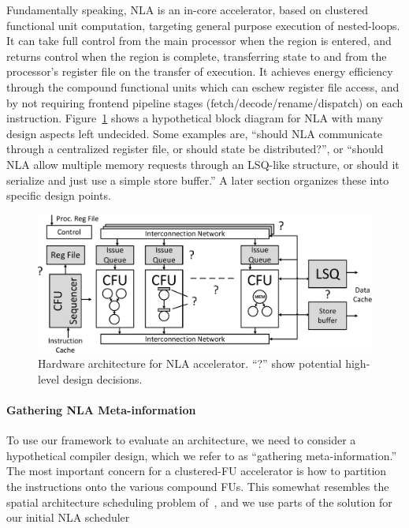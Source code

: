 Fundamentally speaking, NLA is an in-core accelerator, based on clustered functional
unit computation, targeting general purpose execution of nested-loops.  It can
take full control from the main processor when the region is entered, and returns
control when the region is complete, transferring state to and from the processor's
register file on the transfer of execution.   It achieves energy efficiency through
the compound functional units which can eschew register file access, and by not
requiring frontend pipeline stages (fetch/decode/rename/dispatch) on each instruction.
Figure~\ref{fig:nla-arch} shows a hypothetical block diagram for NLA with many design
aspects left undecided.  Some examples are, ``should NLA communicate through
a centralized register file, or should state be distributed?'',  or ``should NLA allow
multiple memory requests through an LSQ-like structure, or should it serialize and 
just use a simple store buffer.''  
A later section organizes these into specific design points.


\begin{figure}
  \begin{center}
    \includegraphics[width=0.85\linewidth]{figs/nla-arch.pdf}
  \end{center}
\vspace{-0.2in}
  \caption{Hardware architecture for NLA accelerator.  ``?'' show potential high-level design decisions.}
  \label{fig:nla-arch}
\vspace{-0.05in}
\end{figure}


\paragraph{Gathering NLA Meta-information}
To use our framework to evaluate an architecture, we need to consider a hypothetical
compiler design, which we refer to as ``gathering meta-information.''  
The most important concern for a clustered-FU accelerator is how to partition the
instructions onto the various compound FUs.  This somewhat resembles the spatial 
architecture scheduling problem of~\cite{ILP_Sched}, and we use parts of the solution
for our initial NLA scheduler


